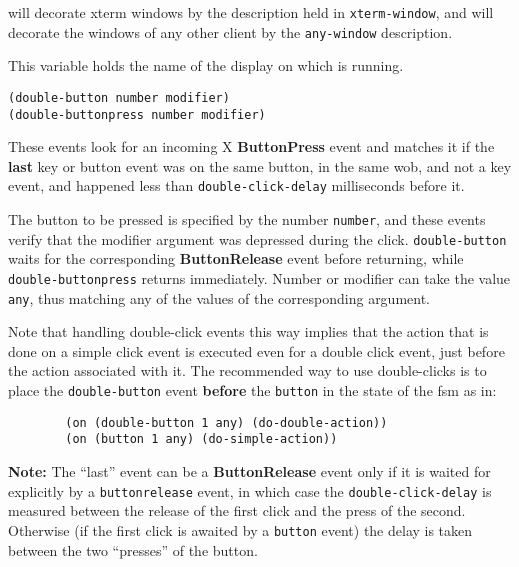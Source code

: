 {\GWM} will decorate xterm windows by the description held in
\verb"xterm-window", and will decorate the windows of any other client by
the \verb"any-window" description.

        

This variable holds the name of the display on which {\GWM} is running.

        
{\usagefont\begin{verbatim}
(double-button number modifier)
(double-buttonpress number modifier)
\end{verbatim}}\usageupspace

These events look for an incoming X {\bf ButtonPress} event and matches it
if the {\bf last} key or button event was on the same button, in the same
wob, and not a key event, and happened less than \verb"double-click-delay"
milliseconds before it.

The button to be pressed is specified by the number \verb"number", and these
events verify that the modifier argument was depressed during the click.
\verb"double-button" waits for the corresponding {\bf ButtonRelease}
event before returning, while \verb"double-buttonpress" returns
immediately.  Number or modifier can take the value \verb"any", thus
matching any of the values of the corresponding argument.  

Note that handling double-click events this way implies that the action that
is done on a simple click event is executed even for a double click event,
just before the action associated with it. The recommended way to use
double-clicks is to place the \verb"double-button" event {\bf before} the
\verb"button" in the state of the fsm as in:

{\exemplefont\begin{verbatim}
        (on (double-button 1 any) (do-double-action))
        (on (button 1 any) (do-simple-action))
\end{verbatim}}

{\bf Note:} The ``last'' event can be a {\bf ButtonRelease} event only if it
is waited for explicitly by a {\GWM} \verb"buttonrelease" event, in which
case the \verb"double-click-delay" is measured between the release of the
first click and the press of the second. Otherwise (if the first click is
awaited by a \verb"button" event) the delay is taken between the two
``presses'' of the button.

